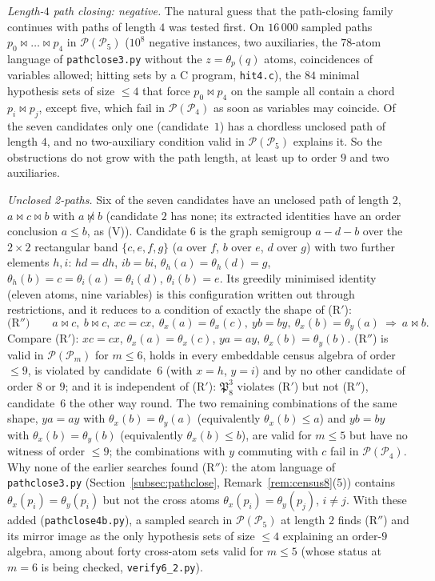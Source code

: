 \documentclass[11pt]{amsart}
\theoremstyle{definition}
\renewcommand{\P}{\mathcal{P}}
\newcommand{\mt}{\bowtie}   %
\begin{document}
\smallskip
\emph{Length-$4$ path closing: negative.} The natural guess that the path-closing family continues with paths of length $4$ was tested first. On $16\,000$ sampled paths $p_0\mt\dots\mt p_4$ in $\P(\P_5)$ ($10^8$ negative instances, two auxiliaries, the $78$-atom language of \texttt{pathclose3.py} without the $z=\theta_p(q)$ atoms, coincidences of variables allowed; hitting sets by a C program, \texttt{hit4.c}), the $84$ minimal hypothesis sets of size $\le4$ that force $p_0\mt p_4$ on the sample all contain a chord $p_i\mt p_j$, except five, which fail in $\P(\P_4)$ as soon as variables may coincide. Of the seven candidates only one (candidate~$1$) has a chordless unclosed path of length $4$, and no two-auxiliary condition valid in $\P(\P_5)$ explains it. So the obstructions do not grow with the path length, at least up to order $9$ and two auxiliaries.

\smallskip
\emph{Unclosed 2-paths.} Six of the seven candidates have an unclosed path of length $2$, $a\mt c\mt b$ with $a\not\mt b$ (candidate $2$ has none; its extracted identities have an order conclusion $a\le b$, as (V)). Candidate $6$ is the graph semigroup $a-d-b$ over the $2\times2$ rectangular band $\{c,e,f,g\}$ ($a$ over $f$, $b$ over $e$, $d$ over $g$) with two further elements $h,i$: $hd=dh$, $ib=bi$, $\theta_h(a)=\theta_h(d)=g$, $\theta_h(b)=c=\theta_i(a)=\theta_i(d)$, $\theta_i(b)=e$. Its greedily minimised identity (eleven atoms, nine variables) is this configuration written out through restrictions, and it reduces to a condition of exactly the shape of (R$'$):
\begin{equation}\label{eq:Rpp}
\text{(R$''$)}\qquad a\mt c,\ b\mt c,\ xc=cx,\ \theta_x(a)=\theta_x(c),\ yb=by,\ \theta_x(b)=\theta_y(a)\ \Longrightarrow\ a\mt b .
\end{equation}
Compare (R$'$): $xc=cx$, $\theta_x(a)=\theta_x(c)$, $ya=ay$, $\theta_x(b)=\theta_y(b)$. (R$''$) is valid in $\P(\P_m)$ for $m\le6$, holds in every embeddable census algebra of order $\le9$, is violated by candidate~$6$ (with $x=h$, $y=i$) and by no other candidate of order $8$ or $9$; and it is independent of (R$'$): $\mathfrak P_8^3$ violates (R$'$) but not (R$''$), candidate~$6$ the other way round. The two remaining combinations of the same shape, $ya=ay$ with $\theta_x(b)=\theta_y(a)$ (equivalently $\theta_x(b)\le a$) and $yb=by$ with $\theta_x(b)=\theta_y(b)$ (equivalently $\theta_x(b)\le b$), are valid for $m\le5$ but have no witness of order $\le9$; the combinations with $y$ commuting with $c$ fail in $\P(\P_4)$. Why none of the earlier searches found (R$''$): the atom language of \texttt{pathclose3.py} (Section~\ref{subsec:pathclose}, Remark~\ref{rem:census8}(5)) contains $\theta_x(p_i)=\theta_y(p_i)$ but not the cross atoms $\theta_x(p_i)=\theta_y(p_j)$, $i\ne j$. With these added (\texttt{pathclose4b.py}), a sampled search in $\P(\P_5)$ at length $2$ finds (R$''$) and its mirror image as the only hypothesis sets of size $\le4$ explaining an order-$9$ algebra, among about forty cross-atom sets valid for $m\le5$ (whose status at $m=6$ is being checked, \texttt{verify6\_2.py}).
\end{document}

